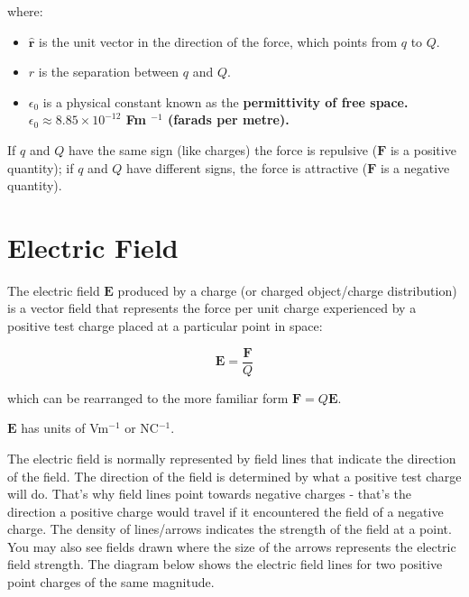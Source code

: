 \documentclass[
  letterpaper,
  DIV=11,
  numbers=noendperiod]{scrreprt}
\providecommand{\tightlist}{%
  \setlength{\itemsep}{0pt}\setlength{\parskip}{0pt}}\usepackage{longtable,booktabs,array}
\begin{document}
where:

\begin{itemize}
\tightlist
\item
  \(\hat{\mathrm{\mathbf{r}}}\) is the unit vector in the direction of
  the force, which points from \(q\) to \(Q\).
\item
  \(r\) is the separation between \(q\) and \(Q\).
\item
  \(\epsilon_0\) is a physical constant known as the
  \bf{permittivity of free space}.  $\epsilon_0 \approx 8.85 \times 10^{-12}$ Fm $^{-1}$ (farads per metre). 
\end{itemize}

If \(q\) and \(Q\) have the same sign (like charges) the force is
repulsive (\(\mathrm{\mathbf{F}}\) is a positive quantity); if \(q\) and
\(Q\) have different signs, the force is attractive
(\(\mathrm{\mathbf{F}}\) is a negative quantity).

\section{Electric Field}\label{electric-field}

The electric field \(\mathrm{\mathbf{E}}\) produced by a charge (or
charged object/charge distribution) is a vector field that represents
the force per unit charge experienced by a positive test charge placed
at a particular point in space:

\[ \mathrm{\mathbf{E}}= \frac{\mathrm{\mathbf{F}}}{Q} \]

\noindent which can be rearranged to the more familiar form
\(\mathrm{\mathbf{F}}= Q \mathrm{\mathbf{E}}\).

\(\mathbf{E}\) has units of Vm\(^{-1}\) or NC\(^{-1}\).

The electric field is normally represented by field lines that indicate
the direction of the field. The direction of the field is determined by
what a positive test charge will do. That's why field lines point
towards negative charges - that's the direction a positive charge would
travel if it encountered the field of a negative charge. The density of
lines/arrows indicates the strength of the field at a point. You may
also see fields drawn where the size of the arrows represents the
electric field strength. The diagram below shows the electric field
lines for two positive point charges of the same magnitude.
\end{document}
